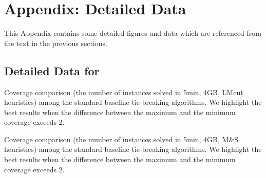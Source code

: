 

\chapter{Appendix: Detailed Data}
\label{sec:appendix}

This Appendix contains some detailed figures and data which are referenced from the text in the previous sections. 


\section{Detailed Data for }

\begin{table}[htbp]
 {
 \centering
 
 \caption{
 Coverage comparison (the number of instances solved in 5min, 4GB, LMcut
 heuristics) among
 the standard baseline tie-breaking algorithms. We highlight the
 best results when the difference between the maximum and the minimum coverage exceeds 2.
 }
 \label{tbl:lmcut-ipc-std}
 }
\end{table}

\begin{table}[htbp]
 {
 \centering
 
 \caption{
 Coverage comparison (the number of instances solved in 5min, 4GB, M\&S heuristics) among
 the standard baseline tie-breaking algorithms. We highlight the
 best results when the difference between the maximum and the minimum coverage exceeds 2.
 }
 \label{tbl:mands-ipc-std}
 }
\end{table}

%
% 
%  

